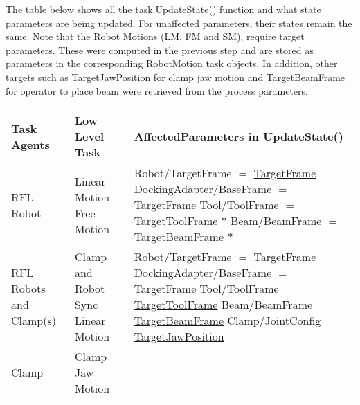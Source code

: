 The table below shows all the task.UpdateState() function and what state parameters are being updated. For unaffected parameters, their states remain the same. Note that the Robot Motions (LM, FM and SM), require target parameters. These were computed in the previous step and are stored as parameters in the corresponding RobotMotion task objects. In addition, other targets such as TargetJawPosition for clamp jaw motion and TargetBeamFrame for operator to place beam were retrieved from the process parameters.

\begin{table}[H]
\begin{adjustbox}{max width=\textwidth}
\begin{tabular}{p{2.38cm}p{5.42cm}p{8.21cm}}
\hline
\multicolumn{1}{|p{2.38cm}}{{\footnotesize \textbf{Task Agents}}} & 
\multicolumn{1}{|p{5.42cm}}{{\footnotesize \textbf{Low Level Task}}} & 
\multicolumn{1}{|p{8.21cm}|}{{\footnotesize \textbf{AffectedParameters in UpdateState()}}} \\ 
\hline
\multicolumn{1}{|p{2.38cm}}{{\footnotesize RFL Robot}} & 
\multicolumn{1}{|p{5.42cm}}{{\footnotesize Linear Motion} \newline
{\footnotesize Free Motion}} & 
\multicolumn{1}{|p{8.21cm}|}{{\footnotesize Robot/TargetFrame $=$ \uline{TargetFrame}} \newline
{\footnotesize DockingAdapter/BaseFrame $=$  \uline{TargetFrame}} \newline
{\footnotesize Tool/ToolFrame $=$ \uline{TargetToolFrame }$\ast$} \newline
{\footnotesize Beam/BeamFrame $=$ \uline{TargetBeamFrame }$\ast$}} \\ 
\hline
\multicolumn{1}{|p{2.38cm}}{{\footnotesize RFL Robots and Clamp(s)}} & 
\multicolumn{1}{|p{5.42cm}}{{\footnotesize Clamp and Robot Sync Linear Motion}} & 
\multicolumn{1}{|p{8.21cm}|}{{\footnotesize Robot/TargetFrame $=$ \uline{TargetFrame}} \newline
{\footnotesize DockingAdapter/BaseFrame $=$  \uline{TargetFrame}} \newline
{\footnotesize Tool/ToolFrame $=$ \uline{TargetToolFrame}} \newline
{\footnotesize Beam/BeamFrame $=$ \uline{TargetBeamFrame}} \newline
{\footnotesize Clamp/JointConfig $=$ \uline{TargetJawPosition}}} \\ 
\hline
\multicolumn{1}{|p{2.38cm}}{\multirow{3}{*}{\parbox{2.38cm}{{\footnotesize Clamp}}}} & 
\multicolumn{1}{|p{5.42cm}}{{\footnotesize Clamp Jaw Motion}} & 

\end{tabular}
\end{adjustbox}
\end{table}
